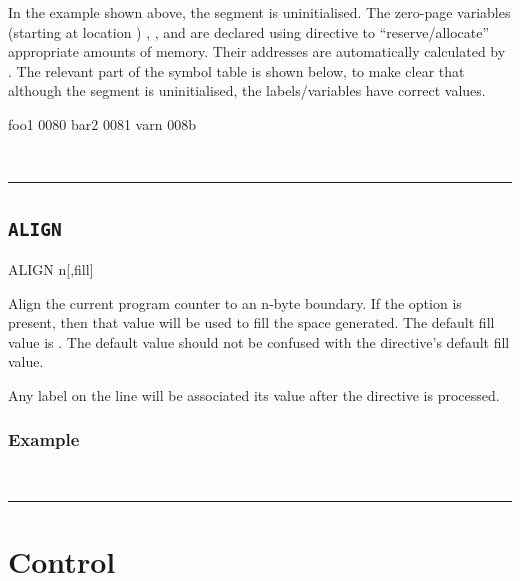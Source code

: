 In the example shown above, the  segment is uninitialised. The zero-page variables (starting at location ) , , and  are declared using  directive to ``reserve/allocate'' appropriate amounts of memory. Their addresses are automatically calculated by \dasm. The relevant part of the symbol table is shown below, to make clear that although the segment is uninitialised, the labels/variables have correct values.

\begin{outputx}
foo1                     0080                  
bar2                     0081                  
varn                     008b                  
\end{outputx}\\

\hrule

\subsection{\texttt{ALIGN}}
\label{pseudoop:align}

\begin{usage}
  ALIGN n[,fill]
\end{usage}

Align the current program counter to an n-byte boundary. If the  option is present, then that value will be used to fill the space generated. The default fill value is . The  default value should not be confused with the 
directive's default fill value.

Any label on the  line will be associated its value after the directive is processed.

\subsubsection{Example}

\\

\hrule




\section{Control}


